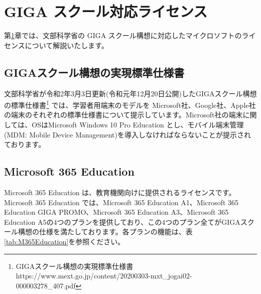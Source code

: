 \chapter{GIGA スクール対応ライセンス}\label{sec:ライセンス}

第\ref{sec:ライセンス}章では、文部科学省の GIGA スクール構想に対応したマイクロソフトのライセンスについて解説いたします。

\section{GIGAスクール構想の実現標準仕様書}

文部科学省が令和2年3月3日更新(令和元年12月20日公開)したGIGAスクール構想の標準仕様書\footnote{GIGAスクール構想の実現標準仕様書 https:\slash\slash www.mext.go.jp\slash content\slash 20200303-mxt\_jogai02-000003278\_407.pdf} では、学習者用端末のモデルを Microsoft社、Google社、Apple社の端末のそれぞれの標準仕様書について提示しています。Microsoft社の端末に関しては、OSはMicrosoft Windows 10 Pro Education とし、モバイル端末管理(MDM: Mobile Device Management)を導入しなければならないことが提示されております。

\section{Microsoft 365 Education}

Microsoft 365 Education は、教育機関向けに提供されるライセンスです。Microsoft 365 Education では、Microsoft 365 Education A1、Microsoft 365 Education GIGA PROMO、Microsoft 365 Education A3、Microsoft 365 Education A5の4つのプランを提供しており、この4つのプラン全てがGIGAスクール構想の仕様を満たしております。各プランの機能は、表 \ref{tab:M365Education}を参照ください。


